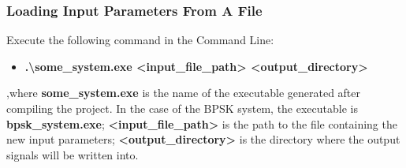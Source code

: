 \subsubsection{Loading Input Parameters From A File}
Execute the following command in the Command Line:
\begin{itemize}
  \item[] \textbf{.\textbackslash{}some\_system.exe <input\_file\_path> <output\_directory>}
\end{itemize}

,where \textbf{some\_system.exe} is the name of the executable generated after compiling the project.
In the case of the BPSK system, the executable is \textbf{bpsk\_system.exe}; \textbf{<input\_file\_path>} is the path to the file containing the new input parameters; \textbf{<output\_directory>} is the directory where the output signals will be written into.

